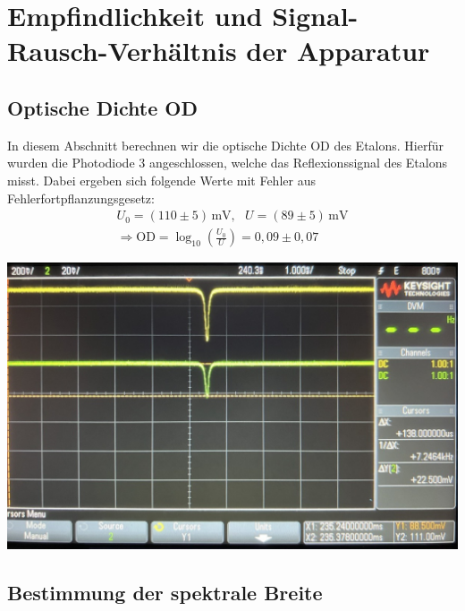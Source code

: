 \newpage

\section{Empfindlichkeit und Signal-Rausch-Verhältnis der Apparatur}
\label{sec:signalRausch}

\subsection{Optische Dichte OD}
\label{sub:opDichte}

In diesem Abschnitt berechnen wir die optische Dichte OD des Etalons. Hierfür wurden die Photodiode 3 angeschlossen, welche das Reflexionssignal des Etalons misst. Dabei ergeben sich folgende Werte mit Fehler aus Fehlerfortpflanzungsgesetz:
\begin{gather}
    U_0 = (110 \pm 5)\,\mathrm{mV}, ~~~U = (89 \pm 5)\,\mathrm{mV}\\[0,5cm]
    \Rightarrow \boxed{\mathrm{OD} = \log_{10}\left(\frac{U_0}{U}\right) = 0,09 \pm 0,07}
\end{gather} 

\begin{center}
    \captionsetup{type=figure}
    \includegraphics[scale=0.2]{Bilder/Signal-Rausch/signal-rausch_od.jpg}
    \label{fig:opDichte}
\end{center}

\subsection{Bestimmung der spektrale Breite}
\label{sub:specBreite}

